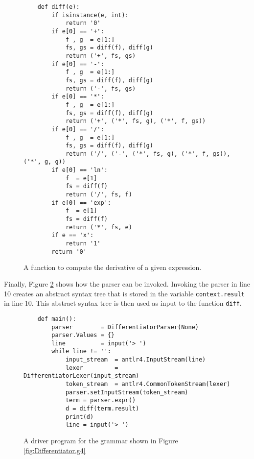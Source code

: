 \begin{figure}[!ht]
\centering
\begin{verbatim}
    def diff(e):
        if isinstance(e, int):
            return '0'
        if e[0] == '+':
            f , g  = e[1:]
            fs, gs = diff(f), diff(g)
            return ('+', fs, gs)
        if e[0] == '-':
            f , g  = e[1:]
            fs, gs = diff(f), diff(g)
            return ('-', fs, gs)
        if e[0] == '*':
            f , g  = e[1:]
            fs, gs = diff(f), diff(g)
            return ('+', ('*', fs, g), ('*', f, gs))
        if e[0] == '/':
            f , g  = e[1:]
            fs, gs = diff(f), diff(g)
            return ('/', ('-', ('*', fs, g), ('*', f, gs)), ('*', g, g))
        if e[0] == 'ln':
            f  = e[1]
            fs = diff(f) 
            return ('/', fs, f)
        if e[0] == 'exp':
            f  = e[1]
            fs = diff(f) 
            return ('*', fs, e)
        if e == 'x':
            return '1'
        return '0'
\end{verbatim}
\vspace*{-0.3cm}
\caption{A function to compute the derivative of a given expression.}
\label{fig:Differentiator.ipynb:diff}
\end{figure}


Finally, Figure \ref{fig:Differentiator.ipynb:main} shows how the parser can be invoked.
Invoking the parser in line 10 creates an abstract syntax tree that is stored in the variable
\texttt{context.result} in line 10.  This abstract syntax tree is then used as input to the function
\texttt{diff}. 

\begin{figure}[!ht]
\centering
\begin{verbatim}
    def main():
        parser        = DifferentiatorParser(None)
        parser.Values = {}
        line          = input('> ')
        while line != '':
            input_stream  = antlr4.InputStream(line)
            lexer         = DifferentiatorLexer(input_stream)
            token_stream  = antlr4.CommonTokenStream(lexer)
            parser.setInputStream(token_stream)
            term = parser.expr()
            d = diff(term.result)
            print(d)
            line = input('> ')
\end{verbatim}
\vspace*{-0.3cm}
\caption{A driver program for the grammar shown in Figure \ref{fig:Differentiator.g4}}
\label{fig:Differentiator.ipynb:main}
\end{figure}
\pagebreak

